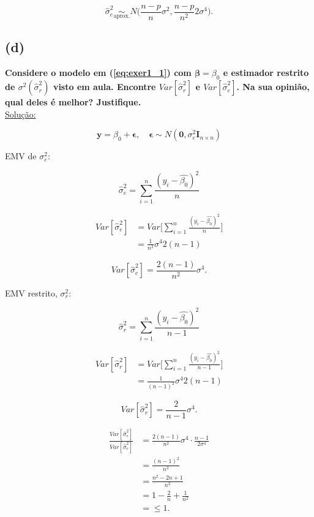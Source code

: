 \documentclass[12pt, oldfontcommands]{article}\usepackage[]{graphicx}\usepackage[]{color}
\begin{document}
\[ \boxed{\hat{\sigma}_{e}^{2} \underset{\text{aprox.}}{\sim}
          N\bigg(\frac{n - p}{n} \sigma^{2},
                \frac{n - p}{n^{2}} 2 \sigma^{4}\bigg).} \]

\subsection*{(d)} 

\textbf{Considere o modelo em (\ref{eq:exer1_1}) com
        \(\bm{\beta} = \beta_{0}\) e estimador restrito de
        \(\sigma^{2} (\hat{\sigma}_{r}^{2})\) visto em aula. Encontre
        \(Var[\hat{\sigma}_{r}^{2}]\) e \(Var[\hat{\sigma}_{e}^{2}]\).
        Na sua opinião, qual deles é melhor? Justifique.} \\

\underline{Solução:}

\[ \mathbf{y} = \beta_{0} + \bm{\epsilon}, \quad
   \bm{\epsilon} \sim
   N(\mathbf{0}, \sigma_{e}^{2}\mathbf{I}_{n \times n}) \]

\begin{multicols}{2}
EMV de \(\sigma_{e}^{2}\):

\[ \hat{\sigma}_{e}^{2} =
   \sum_{i = 1}^{n} \frac{(y_{i} - \hat{\beta_{0}})^{2}}{n} \]

\begin{align*}
 Var[\hat{\sigma}_{e}^{2}] & =
 Var\Bigg[
 \sum_{i = 1}^{n} \frac{(y_{i} - \hat{\beta_{0}})^{2}}{n}\Bigg] \\ & =
 \frac{1}{n^{2}} \sigma^{4} 2 (n - 1)
\end{align*}

\[ \boxed{Var[\hat{\sigma}_{e}^{2}] =
          \frac{2 (n - 1)}{n^{2}} \sigma^{4}.} \]

EMV restrito, \(\sigma_{r}^{2}\):

\[ \hat{\sigma}_{r}^{2} =
   \sum_{i = 1}^{n} \frac{(y_{i} - \hat{\beta_{0}})^{2}}{n - 1} \]

\begin{align*}
 Var[\hat{\sigma}_{r}^{2}] & =
 Var\Bigg[
 \sum_{i = 1}^{n} \frac{(y_{i} - \hat{\beta_{0}})^{2}}{n - 1}\Bigg] \\
 & = \frac{1}{(n - 1)^{2}} \sigma^{4} 2 (n - 1)
\end{align*}

\[ \boxed{Var[\hat{\sigma}_{r}^{2}] = \frac{2}{n - 1} \sigma^{4}.} \]
\end{multicols}

\begin{align*}
 \frac{Var[\hat{\sigma}_{e}^{2}]}{Var[\hat{\sigma}_{r}^{2}]} & =
 \frac{2 (n - 1)}{n^{2}} \sigma^{4} \cdot \frac{n - 1}{2 \sigma^{4}} \\
 & = \frac{(n - 1)^{2}}{n^{2}} \\ & = \frac{n^{2} - 2n + 1}{n^{2}} \\
 & = 1 - \frac{2}{n} + \frac{1}{n^{2}} \\ & = \leq 1.
\end{align*}
\end{document}

